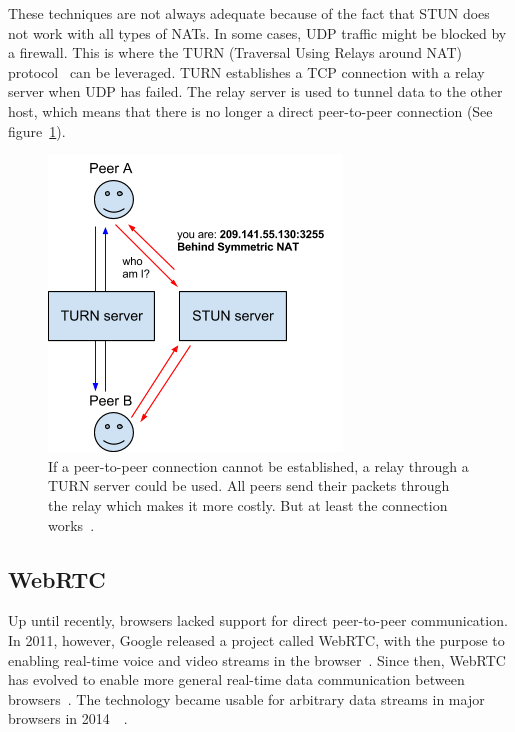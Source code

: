 These techniques are not always adequate because of the fact that STUN does not work with all types of NATs. In some cases, UDP traffic might be blocked by a firewall. This is where the TURN (Traversal Using Relays around NAT) protocol~\cite{RFC5766:Online} can be leveraged.  TURN establishes a TCP connection with a relay server when UDP has failed. The relay server is used to tunnel data to the other host, which means that there is no longer a direct peer-to-peer connection (See figure~\ref{fig:WebRTC - TURN}).

\begin{figure}[htp]
\centering
\includegraphics[width=\textwidth,height=0.2\paperheight,keepaspectratio
]{figures/webrtc-turn}
\caption{If a peer-to-peer connection cannot be established, a relay through a TURN server could be used. All peers send their packets through the relay which makes it more costly. But at least the connection works~\cite{WebRTCArchitecture:2014:Online}.}
\label{fig:WebRTC - TURN}
\end{figure}

\subsection{WebRTC}

Up until recently, browsers lacked support for direct peer-to-peer communication. In 2011, however, Google released a project called WebRTC, with the purpose to enabling real-time voice and video streams in the browser~\cite{WebRTCMemo:Online}. Since then, WebRTC has evolved to enable more general real-time data communication between browsers~\cite{WebRTC:Online}. The technology became usable for arbitrary data streams in major browsers in 2014~\cite{WebRTCChrome:Online}~\cite{WebRTCFirefox:Online}.

